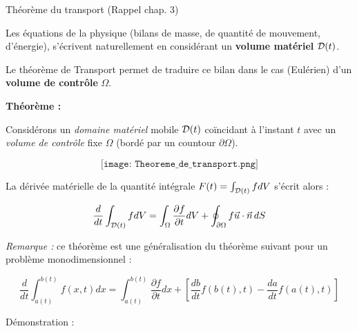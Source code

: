 \begin{frame}{Théorème du transport (Rappel chap. 3)}


\small

Les équations de la physique (bilans de masse, de quantité de mouvement, d'énergie), s'écrivent naturellement en considérant un \textcolor{rouge}{\bf volume matériel}  ${\cal D} (t)$.

\smallskip

Le théorème de Transport permet de traduire ce bilan dans le cas (Eulérien) d'un \textcolor{bleu}{\bf volume de contrôle} $\Omega$.


\pause
\smallskip

{\bf Théorème :} 


Considérons un {\em domaine matériel } mobile ${\cal D} (t)$ coïncidant à l'instant $t$ avec un {\em volume de contrôle } fixe $\Omega$ (bordé par un countour $\partial \Omega$).

$$
\texttt{[image: Theoreme\_de\_transport.png]}
$$



La dérivée matérielle de la quantité intégrale $F(t) =  \int_{{\cal D}(t)} f d V$ s'écrit alors  :

$$
\frac{d}{dt} \int_{{\cal D}(t)} f d V  = \int_\Omega \frac{\partial f } {\partial t} dV + \oint_{\partial\Omega} f\vec{u}\cdot\vec{n}\, dS
$$


\medskip
\pause









{\em Remarque :} ce théorème est une généralisation du théorème suivant pour un problème monodimensionnel :

$$
\frac{d}{dt} \int_{a(t)}^{b(t)} f(x,t) dx = \int_{a(t)}^{b(t)}  \frac{\partial f}{\partial t} d x + \left[ \frac{d b}{dt} f(b(t),t)  - \frac{d a}{dt} f(a(t),t) \right]
$$


{\color{green} Démonstration :}

\end{frame}


